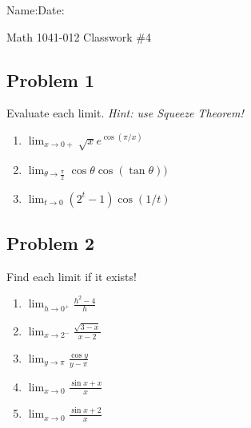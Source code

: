 \documentclass[10pt]{book}
\theoremstyle{definition}
\begin{document}
\begin{flushleft}
Name:\underline{\hspace{13cm}}Date:\underline{\hspace{2cm}}
\end{flushleft}
\begin{center}
{\Large Math 1041-012 \hspace{0.5cm} Classwork \#4}
\end{center}
\vspace{0.2 cm}
\subsection*{Problem 1}
Evaluate each limit. \textit{Hint: use Squeeze Theorem!}
\begin{enumerate}[label=(\alph*)]
    \item $\displaystyle\lim_{x\rightarrow 0+}\sqrt{x}e^{\cos(\pi/x)}$\vspace{2cm}
    \item 
    $\displaystyle \lim_{\theta\rightarrow \frac{\pi}{2}}\cos\theta \cos(\tan\theta))$\vspace{2cm}
    \item $\displaystyle\lim_{t\rightarrow 0}(2^t-1)\cos(1/t)$\vspace{2cm}
\end{enumerate}
\subsection*{Problem 2}
Find each limit if it exists!
\begin{enumerate}[label=(\alph*)]
    \item $\displaystyle\lim_{h\rightarrow 0^+}\frac{h^2-4}{h}$\vspace{1cm}
    \item $\displaystyle\lim_{x\rightarrow 2^-}\frac{\sqrt{3-x}}{x-2}$\vspace{1cm}
    \item$\displaystyle\lim_{y\rightarrow\pi}\frac{\cos y}{y-\pi}$\vspace{1cm}
    \item $\displaystyle\lim_{x\rightarrow 0}\frac{\sin x+x}{x}$\vspace{1cm}
    \item $\displaystyle\lim_{x\rightarrow 0}\frac{\sin x+2}{x}$
\end{enumerate}
\end{document}
